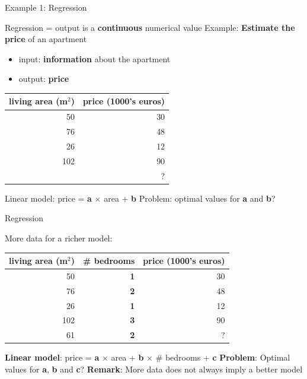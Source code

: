 \documentclass{beamer}
\begin{document}
\begin{frame}{Example 1: Regression}

Regression = output is a \textbf{continuous} numerical value
\vfill
Example: \textbf{Estimate the price} of an apartment
\begin{itemize}
	\item input: \textbf{information} about the apartment
	\item output: \textbf{price}
\end{itemize}
\vfill
\pause
\begin{table}
\centering
\begin{tabular}{r|r}
living area (m$^2$) & price (1000's euros) \\\hline
50 & 30 \\
76 & 48 \\
26 & 12 \\
102 & 90 \\
\pause
61 & ?
\end{tabular}
\end{table}
\vfill
Linear model: price = \textbf{a} $\times$ area + \textbf{b}
\vfill
Problem: optimal values for \textbf{a} and \textbf{b}?

\end{frame}

\begin{frame}{Regression}

More data for a richer model:
\vfill
\begin{table}
\centering
\begin{tabular}{r|r|r}
living area (m$^2$) &  \textbf{\# bedrooms} & price (1000's euros) \\\hline
50 & \textbf{1} & 30\\
76 & \textbf{2} & 48\\
26 & \textbf{1} & 12\\
102 & \textbf{3} & 90\\
61 & \textbf{2} & ?
\end{tabular}
\end{table}

\vfill
\textbf{Linear model}: price = \textbf{a} $\times$ area + \textbf{b} $\times$ \# bedrooms + \textbf{c}
\vfill
\textbf{Problem}: Optimal values for \textbf{a}, \textbf{b} and \textbf{c}?
\vfill
\textbf{Remark}: More data does not always imply a better model
\end{frame}
\end{document}
